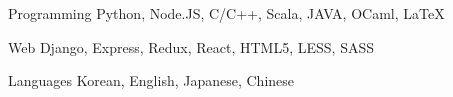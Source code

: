 

\begin{cvskills}

  \cvskill
    {Programming} %
    {Python, Node.JS, C/C++, Scala, JAVA, OCaml, LaTeX} %

  \cvskill
    {Web} %
    {Django, Express, Redux, React, HTML5, LESS, SASS} %

  \cvskill
    {Languages} %
    {Korean, English, Japanese, Chinese} %

\end{cvskills}
